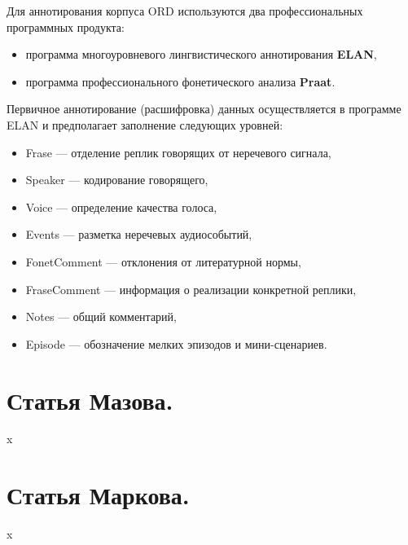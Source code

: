 \documentclass[12pt]{article}
\theoremstyle{definition}
\theoremstyle{remark}
\numberwithin{equation}{section}
\begin{document}
Для аннотирования корпуса ORD используются два профессиональных программных продукта:
\begin{itemize}
\item программа многоуровневого лингвистического аннотирования \textbf{ELAN},
\item программа профессионального фонетического анализа \textbf{Praat}.
\end{itemize}

Первичное аннотирование (расшифровка) данных осуществляется в программе ELAN и предполагает заполнение следующих уровней:
\begin{itemize}
\item Frase --- отделение реплик говорящих от неречевого сигнала,
\item Speaker --- кодирование говорящего,
\item Voice --- определение качества голоса,
\item Events --- разметка неречевых аудиособытий,
\item FonetComment --- отклонения от литературной нормы,
\item FraseComment --- информация о реализации конкретной реплики,
\item Notes --- общий комментарий,
\item Episode --- обозначение мелких эпизодов и мини\nobreakdash-сценариев.
\end{itemize}


\section{Статья Мазова.}
x
\section{Статья Маркова.}
x
\end{document}
